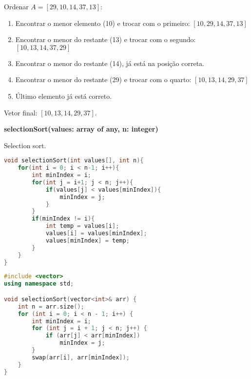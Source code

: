 \begin{exmp}
Ordenar $A = [29, 10, 14, 37, 13]$:

\begin{enumerate}
    \item Encontrar o menor elemento (10) e trocar com o primeiro: $[10, 29, 14, 37, 13]$
    \item Encontrar o menor do restante (13) e trocar com o segundo: $[10, 13, 14, 37, 29]$
    \item Encontrar o menor do restante (14), já está na posição correta.
    \item Encontrar o menor do restante (29) e trocar com o quarto: $[10, 13, 14, 29, 37]$
    \item Último elemento já está correto.
\end{enumerate}

Vetor final: $[10, 13, 14, 29, 37]$.
\end{exmp}

\begin{center}
\begin{minipage}{.9\linewidth}
\begin{algorithm}[H]
\DontPrintSemicolon
\textbf{selectionSort(values: array of any, n: integer)}

\caption{Selection sort.}
\label{lab:alg-selectionSort}
\end{algorithm}
\end{minipage}
\end{center}

\begin{lstlisting}[language=C,caption={Selection sort em C},captionpos=t]
void selectionSort(int values[], int n){
    for(int i = 0; i < n-1; i++){
        int minIndex = i;
        for(int j = i+1; j < n; j++){
            if(values[j] < values[minIndex]){
                minIndex = j;
            }
        }
        if(minIndex != i){
            int temp = values[i];
            values[i] = values[minIndex];
            values[minIndex] = temp;
        }
    }
}
\end{lstlisting}

\begin{lstlisting}[language=C++,caption={Selection sort em C++},captionpos=t]
#include <vector>
using namespace std;

void selectionSort(vector<int>& arr) {
    int n = arr.size();
    for (int i = 0; i < n - 1; i++) {
        int minIndex = i;
        for (int j = i + 1; j < n; j++) {
            if (arr[j] < arr[minIndex])
                minIndex = j;
        }
        swap(arr[i], arr[minIndex]);
    }
}
\end{lstlisting}

